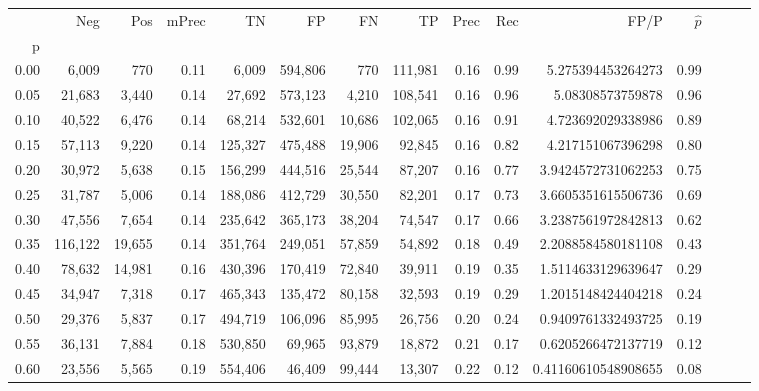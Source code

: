 \begin{tabular}{rrrrrrrrrrrrrrr}
\toprule
{} &      Neg &     Pos & mPrec &       TN &       FP &       FN &       TP &  Prec &   Rec &                  FP/P & $\hat{p}$ \\
p    &          &         &       &          &          &          &          &       &       &                       &           \\
\midrule
0.00 &    6,009 &     770 &  0.11 &    6,009 &  594,806 &      770 &  111,981 &  0.16 &  0.99 &     5.275394453264273 &      0.99 \\
0.05 &   21,683 &   3,440 &  0.14 &   27,692 &  573,123 &    4,210 &  108,541 &  0.16 &  0.96 &      5.08308573759878 &      0.96 \\
0.10 &   40,522 &   6,476 &  0.14 &   68,214 &  532,601 &   10,686 &  102,065 &  0.16 &  0.91 &     4.723692029338986 &      0.89 \\
0.15 &   57,113 &   9,220 &  0.14 &  125,327 &  475,488 &   19,906 &   92,845 &  0.16 &  0.82 &     4.217151067396298 &      0.80 \\
0.20 &   30,972 &   5,638 &  0.15 &  156,299 &  444,516 &   25,544 &   87,207 &  0.16 &  0.77 &    3.9424572731062253 &      0.75 \\
0.25 &   31,787 &   5,006 &  0.14 &  188,086 &  412,729 &   30,550 &   82,201 &  0.17 &  0.73 &    3.6605351615506736 &      0.69 \\
0.30 &   47,556 &   7,654 &  0.14 &  235,642 &  365,173 &   38,204 &   74,547 &  0.17 &  0.66 &    3.2387561972842813 &      0.62 \\
0.35 &  116,122 &  19,655 &  0.14 &  351,764 &  249,051 &   57,859 &   54,892 &  0.18 &  0.49 &    2.2088584580181108 &      0.43 \\
0.40 &   78,632 &  14,981 &  0.16 &  430,396 &  170,419 &   72,840 &   39,911 &  0.19 &  0.35 &    1.5114633129639647 &      0.29 \\
0.45 &   34,947 &   7,318 &  0.17 &  465,343 &  135,472 &   80,158 &   32,593 &  0.19 &  0.29 &    1.2015148424404218 &      0.24 \\
0.50 &   29,376 &   5,837 &  0.17 &  494,719 &  106,096 &   85,995 &   26,756 &  0.20 &  0.24 &    0.9409761332493725 &      0.19 \\
0.55 &   36,131 &   7,884 &  0.18 &  530,850 &   69,965 &   93,879 &   18,872 &  0.21 &  0.17 &    0.6205266472137719 &      0.12 \\
0.60 &   23,556 &   5,565 &  0.19 &  554,406 &   46,409 &   99,444 &   13,307 &  0.22 &  0.12 &   0.41160610548908655 &      0.08 \\

\end{tabular}

